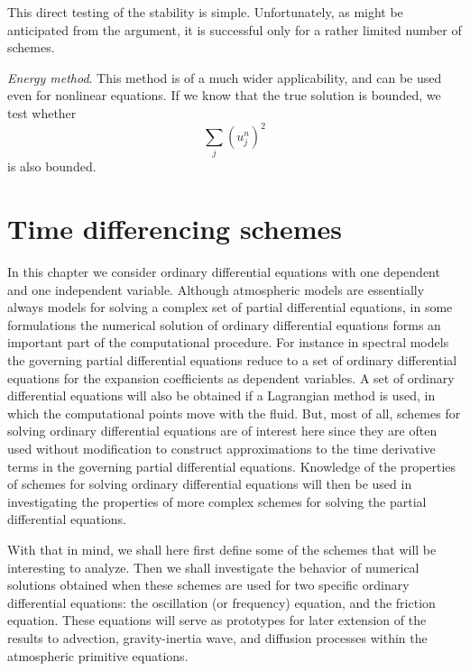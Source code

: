This direct testing of the stability is simple. Unfortunately, as might be anticipated from the argument, it is successful only for a rather limited number of schemes.

\textit{Energy method}. This method is of a much wider applicability, and can be used even for nonlinear equations. If we know that the true solution is bounded, we test whether
$$\displaystyle\sum_j(u_j^n)^2$$
is also bounded.

 
\section{Time differencing schemes}
In this chapter we consider ordinary differential equations with one dependent and one independent variable. Although atmospheric models are essentially always models for solving a complex set of partial differential equations, in some formulations the numerical solution of ordinary differential equations forms an important part of the computational procedure. For instance in spectral models the governing partial differential equations reduce to a set of ordinary differential equations for the expansion coefficients as dependent variables. A set of ordinary differential equations will also be obtained if a Lagrangian method is used, in which the computational points move with the fluid. But, most of all, schemes for solving ordinary differential equations are of interest here since they are often used without modification to construct approximations to the time derivative terms in the governing partial differential equations. Knowledge of the properties of schemes for solving ordinary differential equations will then be used in investigating the properties of more complex schemes for solving the partial differential equations.

With that in mind, we shall here first define some of the schemes that will be interesting to analyze. Then we shall investigate the behavior of numerical solutions obtained when these schemes are used for two specific ordinary differential equations: the oscillation (or frequency) equation, and the friction equation. These equations will serve as prototypes for later extension of the results to advection, gravity-inertia wave, and diffusion processes within the atmospheric primitive equations.

